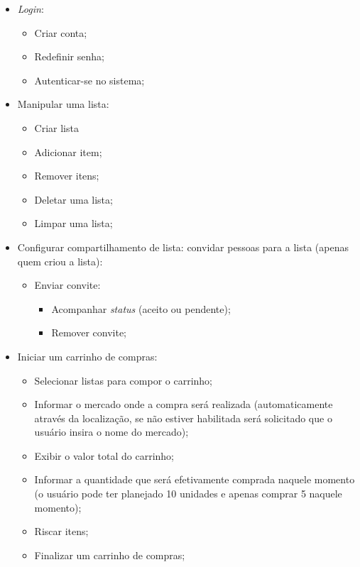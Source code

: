 \begin{itemize}
	\item \textit{Login}:
		\begin{itemize}
			\item Criar conta;
			\item Redefinir senha;
			\item Autenticar-se no sistema;
		\end{itemize}
		
	\item Manipular uma lista:
		\begin{itemize}
			\item Criar lista
			\item Adicionar item;
			\item Remover itens;
			\item Deletar uma lista;
			\item Limpar uma lista;
		\end{itemize}
		
	\item Configurar compartilhamento de lista: convidar pessoas para a lista (apenas quem criou a lista):
		\begin{itemize}
			\item Enviar convite:
				\begin{itemize}
					\item Acompanhar \textit{status} (aceito ou pendente);
					\item Remover convite;
				\end{itemize}
		\end{itemize}
		
	\item Iniciar um carrinho de compras:
		\begin{itemize}
			\item Selecionar listas para compor o carrinho;
			\item Informar o mercado onde a compra será realizada (automaticamente através da localização, se não estiver habilitada será solicitado que o usuário insira o nome do mercado);
			\item Exibir o valor total do carrinho;
			\item Informar a quantidade que será efetivamente comprada naquele momento (o usuário pode ter planejado 10 unidades e apenas comprar 5 naquele momento);
			\item Riscar itens;
			\item Finalizar um carrinho de compras;
		\end{itemize}
		

\end{itemize}
